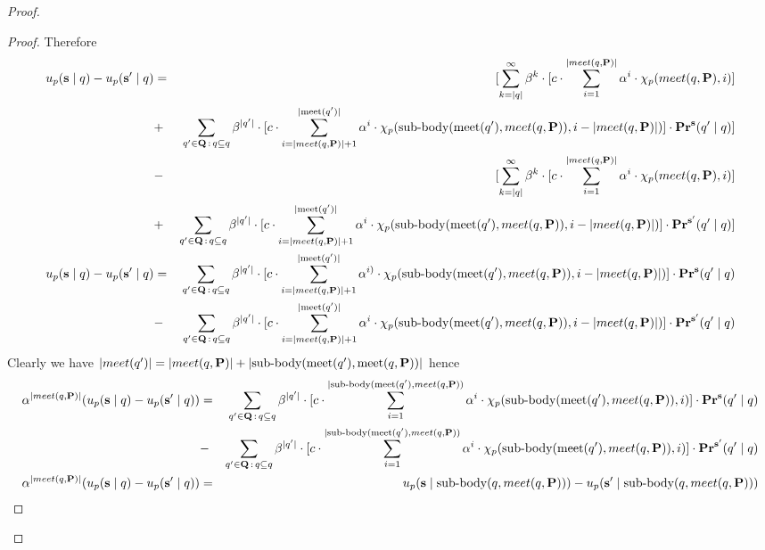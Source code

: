 \begin{proof}
\begin{proof}
Therefore
\begin{eqnarray*}
	u_p(\mathbf{s} \mid q) - u_p(\mathbf{s}' \mid q) & = & [\sum_{k = |q|}^{\infty} \beta^{k} \cdot  [{\displaystyle c \cdot \sum_{i=1}^{|meet(q,\mathbf{P})|} \alpha^i \cdot \chi_p(meet(q,\mathbf{P}),i) }] \\
	&+ & \sum_{q' \in \mathbf{Q} \,:\, q \subseteq q} \beta^{|q'|} \cdot  [{\displaystyle c \cdot \sum_{i=|meet(q,\mathbf{P})|+1}^{|\text{\rm meet}(q')|} \alpha^{i} \cdot \chi_p({\text{\rm sub-body}}(\text{\rm meet}(q'),meet(q,\mathbf{P})),i-|meet(q,\mathbf{P})|)  }] \cdot \mathbf{Pr}^{\mathbf{s}}(q' \mid q) ]\\ 
	&- &[\sum_{k = |q|}^{\infty} \beta^{k} \cdot  [{\displaystyle c \cdot \sum_{i=1}^{|meet(q,\mathbf{P})|} \alpha^i \cdot \chi_p(meet(q,\mathbf{P}),i) }] \\
	&+ & \sum_{q' \in \mathbf{Q} \,:\, q \subseteq q} \beta^{|q'|} \cdot  [{\displaystyle c \cdot \sum_{i=|meet(q,\mathbf{P})|+1}^{|\text{\rm meet}(q')|} \alpha^{i} \cdot \chi_p({\text{\rm sub-body}}(\text{\rm meet}(q'),meet(q,\mathbf{P})),i-|meet(q,\mathbf{P})|)  }] \cdot \mathbf{Pr}^{\mathbf{s}'}(q' \mid q) ]\\ 
	u_p(\mathbf{s} \mid q) - u_p(\mathbf{s}' \mid q) & = & \sum_{q' \in \mathbf{Q} \,:\, q \subseteq q} \beta^{|q'|} \cdot  [{\displaystyle c \cdot \sum_{i=|meet(q,\mathbf{P})|+1}^{|\text{\rm meet}(q')|} \alpha^{i)} \cdot \chi_p({\text{\rm sub-body}}(\text{\rm meet}(q'),meet(q,\mathbf{P})),i-|meet(q,\mathbf{P})|)  }] \cdot \mathbf{Pr}^{\mathbf{s}}(q' \mid q) \\ 
	& - & \sum_{q' \in \mathbf{Q} \,:\, q \subseteq q} \beta^{|q'|} \cdot  [{\displaystyle c \cdot \sum_{i=|meet(q,\mathbf{P})|+1}^{|\text{\rm meet}(q')|} \alpha^{i} \cdot \chi_p({\text{\rm sub-body}}(\text{\rm meet}(q'),meet(q,\mathbf{P})),i-|meet(q,\mathbf{P})|)  }] \cdot \mathbf{Pr}^{\mathbf{s}'}(q' \mid q) \\
\end{eqnarray*}
Clearly we have $|meet(q')| = |meet(q,\mathbf{P})| + |{\text{\rm sub-body}}(\text{\rm meet}(q'),\text{\rm meet}(q,\mathbf{P}))| $ hence 
\begin{eqnarray*}
	 \alpha^{|meet(q,\mathbf{P})|} (u_p(\mathbf{s} \mid q) - u_p(\mathbf{s}' \mid q)) & = & \sum_{q' \in \mathbf{Q} \,:\, q \subseteq q} \beta^{|q'|} \cdot  [{\displaystyle c \cdot \sum_{i=1}^{|{\text{\rm sub-body}}(\text{\rm meet}(q'),meet(q,\mathbf{P}))} \alpha^{i} \cdot \chi_p({\text{\rm sub-body}}(\text{\rm meet}(q'),meet(q,\mathbf{P})),i)  }] \cdot \mathbf{Pr}^{\mathbf{s}}(q' \mid q) \\ 
	& - & \sum_{q' \in \mathbf{Q} \,:\, q \subseteq q} \beta^{|q'|} \cdot  [{\displaystyle c \cdot \sum_{i=1}^{|{\text{\rm sub-body}}(\text{\rm meet}(q'),meet(q,\mathbf{P}))} \alpha^{i} \cdot \chi_p({\text{\rm sub-body}}(\text{\rm meet}(q'),meet(q,\mathbf{P})),i)  }] \cdot \mathbf{Pr}^{\mathbf{s}'}(q' \mid q) \\
	\alpha^{|meet(q,\mathbf{P})|} (u_p(\mathbf{s} \mid q) - u_p(\mathbf{s}' \mid q)) & = & u_p(\mathbf{s} \mid {\text{\rm sub-body}}(q,meet(q,\mathbf{P}))) - u_p(\mathbf{s}' \mid {\text{\rm sub-body}}(q,meet(q,\mathbf{P}))) \\
\end{eqnarray*}
\end{proof}


\end{proof}
